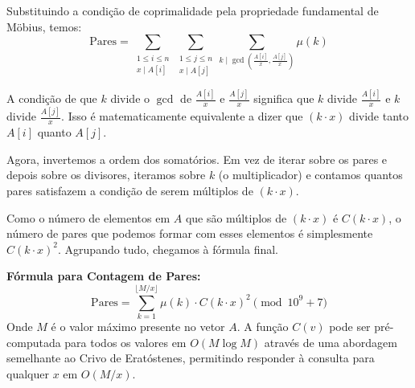 Substituindo a condição de coprimalidade pela propriedade fundamental de Möbius, temos:
$$ \text{Pares} = \sum_{\substack{1 \le i \le n \\ x \mid A[i]}} \sum_{\substack{1 \le j \le n \\ x \mid A[j]}} \sum_{k \mid \gcd\left(\frac{A[i]}{x}, \frac{A[j]}{x}\right)} \mu(k) $$

A condição de que $k$ divide o $\gcd$ de $\frac{A[i]}{x}$ e $\frac{A[j]}{x}$ significa que $k$ divide $\frac{A[i]}{x}$ e $k$ divide $\frac{A[j]}{x}$. Isso é matematicamente equivalente a dizer que $(k \cdot x)$ divide tanto $A[i]$ quanto $A[j]$.

Agora, invertemos a ordem dos somatórios. Em vez de iterar sobre os pares e depois sobre os divisores, iteramos sobre $k$ (o multiplicador) e contamos quantos pares satisfazem a condição de serem múltiplos de $(k \cdot x)$. 

Como o número de elementos em $A$ que são múltiplos de $(k \cdot x)$ é $C(k \cdot x)$, o número de pares que podemos formar com esses elementos é simplesmente $C(k \cdot x)^2$. Agrupando tudo, chegamos à fórmula final.

\textbf{Fórmula para Contagem de Pares:}
$$ \text{Pares} = \sum_{k=1}^{\lfloor M/x \rfloor} \mu(k) \cdot C(k \cdot x)^2 \pmod{10^9+7} $$
Onde $M$ é o valor máximo presente no vetor $A$. A função $C(v)$ pode ser pré-computada para todos os valores em $O(M \log M)$ através de uma abordagem semelhante ao Crivo de Eratóstenes, permitindo responder à consulta para qualquer $x$ em $O(M/x)$.
